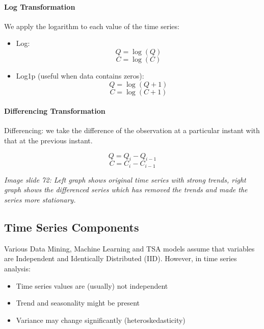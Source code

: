 \paragraph{Log Transformation}
We apply the logarithm to each value of the time series:

\begin{itemize}
    \item Log:
    \begin{equation}
    Q = \log(Q)
    \end{equation}
    \begin{equation}
    C = \log(C)
    \end{equation}
    
    \item Log1p (useful when data contains zeros):
    \begin{equation}
    Q = \log(Q + 1)
    \end{equation}
    \begin{equation}
    C = \log(C + 1)
    \end{equation}
\end{itemize}

\paragraph{Differencing Transformation}

Differencing: we take the difference of the observation at a particular instant with that at the previous instant.

\begin{equation}
Q = Q_i - Q_{i-1}
\end{equation}
\begin{equation}
C = C_i - C_{i-1}
\end{equation}

\textit{Image slide 72: Left graph shows original time series with strong trends, right graph shows the differenced series which has removed the trends and made the series more stationary.}

\subsection{Time Series Components}

Various Data Mining, Machine Learning and TSA models assume that variables are Independent and Identically Distributed (IID). However, in time series analysis:
\begin{itemize}
    \item Time series values are (usually) not independent
    \item Trend and seasonality might be present
    \item Variance may change significantly (heteroskedasticity)
\end{itemize}

